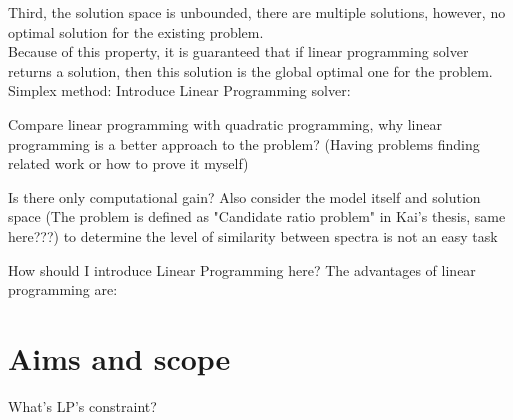 Third, the solution space is unbounded, there are multiple solutions, however, no optimal solution for the existing problem.\\

Because of this property, it is guaranteed that if linear programming solver returns a solution, then this solution is the global optimal one for the problem.\\

Simplex method:
Introduce Linear Programming solver:


	
	
	

	
	
	
	
	
	
Compare linear programming with quadratic programming, why linear programming is a better 	 	approach to the problem? (Having problems finding related work or how to prove it myself)
	
	Is there only computational gain?
	Also consider the model itself and solution space	
(The problem is defined as "Candidate ratio problem" in Kai's thesis, same here???)
	to determine the level of similarity between spectra is not an easy task 
	
	How should I introduce Linear Programming here?
	The advantages of linear programming are: 
\section{Aims and scope}
What's LP's constraint?


